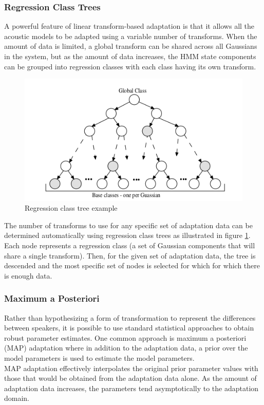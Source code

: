\subsubsection{Regression Class Trees}\label{rcs}
A powerful feature of linear transform-based adaptation is that it allows all the acoustic models to be adapted using a variable number of transforms. When the amount of data is limited, a global transform can be shared across all Gaussians in the system, but as the amount of data increases, the HMM state components can be grouped into regression classes with each class having its own transform.\\
\begin{figure}[!htb]
	\begin{center}
	\includegraphics[width=1\textwidth]{img/RC2.png}
	\end{center}
	\caption{\label{rcimg}Regression class tree example}
\end{figure}
The number of transforms to use for any specific set of adaptation data can be determined automatically using regression class trees as illustrated in figure \ref{rcimg}. Each node represents a regression class (a set of Gaussian components that will share a single transform). Then, for the given set of adaptation data, the tree is descended and the most specific set of nodes is selected for which for which there is enough data.
\subsubsection{Maximum a Posteriori}\label{map}
Rather than hypothesizing a form of transformation to represent the differences between speakers, it is possible to use standard statistical approaches to obtain robust parameter estimates. One common approach is maximum a posteriori (MAP) adaptation where in addition to the adaptation data, a prior over the model parameters is used to estimate the model parameters.\\
MAP adaptation effectively interpolates the original prior parameter values with those that would be obtained from the adaptation data alone. As the amount of adaptation data increases, the parameters tend asymptotically to the adaptation domain.

